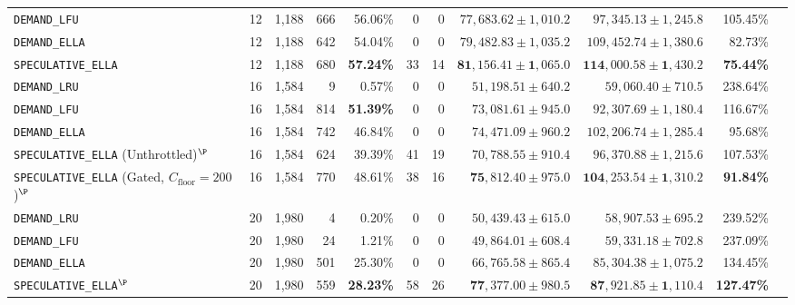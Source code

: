 \documentclass[conference,10pt]{IEEEtran}
\begin{document}
\begin{table}[t]
{\begin{tabular}{@{}lrrrrrrrrrr@{}}
\texttt{DEMAND\_LFU}       & 12 & 1,188 & 666 & 56.06\% & 0  & 0  & $77{,}683.62 \pm 1{,}010.2$ & $97{,}345.13 \pm 1{,}245.8$ & 105.45\% \\
\texttt{DEMAND\_ELLA}      & 12 & 1,188 & 642 & 54.04\% & 0  & 0  & $79{,}482.83 \pm 1{,}035.2$ & $109{,}452.74 \pm 1{,}380.6$ & 82.73\% \\
\texttt{SPECULATIVE\_ELLA} & 12 & 1,188 & 680 & \textbf{57.24\%} & 33 & 14 & $\mathbf{81{,}156.41 \pm 1{,}065.0}$ & $\mathbf{114{,}000.58 \pm 1{,}430.2}$ & \textbf{75.44\%} \\
\midrule
\texttt{DEMAND\_LRU}       & 16 & 1,584 & 9   & 0.57\%  & 0  & 0  & $51{,}198.51 \pm 640.2$ & $59{,}060.40 \pm 710.5$ & 238.64\% \\
\texttt{DEMAND\_LFU}       & 16 & 1,584 & 814 & \textbf{51.39\%} & 0  & 0  & $73{,}081.61 \pm 945.0$ & $92{,}307.69 \pm 1{,}180.4$ & 116.67\% \\
\texttt{DEMAND\_ELLA}      & 16 & 1,584 & 742 & 46.84\% & 0  & 0  & $74{,}471.09 \pm 960.2$ & $102{,}206.74 \pm 1{,}285.4$ & 95.68\% \\
\texttt{SPECULATIVE\_ELLA} (Unthrottled)$^\P$ & 16 & 1,584 & 624 & 39.39\% & 41 & 19 & $70{,}788.55 \pm 910.4$ & $96{,}370.88 \pm 1{,}215.6$ & 107.53\% \\
\texttt{SPECULATIVE\_ELLA} (Gated, $C_{\text{floor}}\!=\!200$)$^\P$ & 16 & 1,584 & 770 & 48.61\% & 38 & 16 & $\mathbf{75{,}812.40 \pm 975.0}$ & $\mathbf{104{,}253.54 \pm 1{,}310.2}$ & \textbf{91.84\%} \\
\midrule
\texttt{DEMAND\_LRU}       & 20 & 1,980 & 4   & 0.20\%  & 0  & 0  & $50{,}439.43 \pm 615.0$  & $58{,}907.53 \pm 695.2$ & 239.52\% \\
\texttt{DEMAND\_LFU}       & 20 & 1,980 & 24  & 1.21\%  & 0  & 0  & $49{,}864.01 \pm 608.4$  & $59{,}331.18 \pm 702.8$ & 237.09\% \\
\texttt{DEMAND\_ELLA}      & 20 & 1,980 & 501 & 25.30\% & 0  & 0  & $66{,}765.58 \pm 865.4$  & $85{,}304.38 \pm 1{,}075.2$ & 134.45\% \\
\texttt{SPECULATIVE\_ELLA}$^\P$ & 20 & 1,980 & 559 & \textbf{28.23\%} & 58 & 26 & $\mathbf{77{,}377.00 \pm 980.5}$ & $\mathbf{87{,}921.85 \pm 1{,}110.4}$ & \textbf{127.47\%} \\
\bottomrule
\end{tabular}%
}
\vspace{2pt}
\begin{minipage}{\textwidth}
\footnotesize

\end{minipage}
\end{table}
\end{document}
